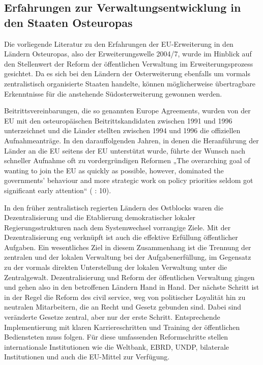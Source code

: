 \subsection{Erfahrungen zur Verwaltungsentwicklung in den Staaten Osteuropas}
\label{subsec:Verwaltungsentwicklung}
Die vorliegende Literatur zu den Erfahrungen der EU-Erweiterung in den Ländern Osteuropas, also der Erweiterungswelle 2004/7, wurde im Hinblick auf den Stellenwert der Reform der öffentlichen Verwaltung im Erweiterungsprozess gesichtet. Da es sich bei den Ländern der Osterweiterung ebenfalls um vormals zentralistisch organisierte Staaten handelte, können möglicherweise übertragbare Erkenntnisse für die anstehende Südosterweiterung gewonnen werden. \par

Beitrittsvereinbarungen, die so genannten Europe Agreements, wurden von der EU mit den osteuropäischen Beitrittskandidaten zwischen 1991 und 1996 unterzeichnet und die Länder stellten zwischen 1994 und 1996 die offiziellen Aufnahmeanträge. In den darauffolgenden Jahren, in denen die Heranführung der Länder an die EU seitens der EU unterstützt wurde, führte der Wunsch nach schneller Aufnahme oft zu vordergründigen Reformen „The overarching goal of wanting to join the EU as quickly as possible, however, dominated the governments’ behaviour and more strategic work on policy priorities seldom got significant early attention“ (\cite{summa} : 10).\par
In den früher zentralistisch regierten Ländern des Ostblocks waren die Dezentralisierung und die Etablierung demokratischer lokaler Regierungsstrukturen nach dem Systemwechsel vorrangige Ziele. Mit der Dezentralisierung eng verknüpft ist auch die effektive Erfüllung öffentlicher Aufgaben. Ein wesentliches Ziel in diesem Zusammenhang ist die Trennung der zentralen und der lokalen Verwaltung bei der Aufgabenerfüllung, im Gegensatz zu der vormals direkten Unterstellung der lokalen Verwaltung unter die Zentralgewalt. Dezentralisierung und Reform der öffentlichen Verwaltung gingen und gehen also in den betroffenen Ländern Hand in Hand. Der nächste Schritt ist in der Regel die Reform des civil service, weg von politischer Loyalität hin zu neutralen Mitarbeitern, die an Recht und Gesetz gebunden sind. Dabei sind veränderte Gesetze zentral, aber nur der erste Schritt. Entsprechende Implementierung mit klaren Karriereschritten und Training der öffentlichen Bediensteten muss folgen. Für diese umfassenden Reformschritte stellen internationale Institutionen wie die Weltbank, EBRD, UNDP, bilaterale Institutionen und auch die EU-Mittel zur Verfügung.\par
